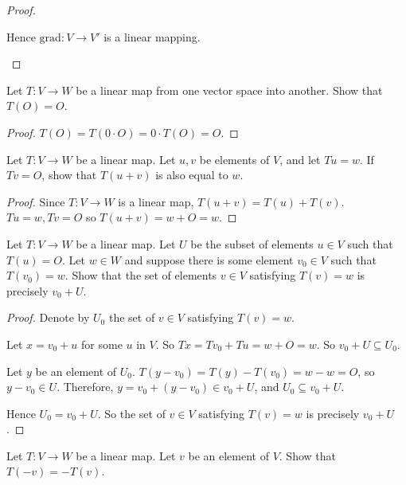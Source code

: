 \begin{proof}
\begin{enumerate}[label={(\alph*)}]
              Hence $\text{grad}: V \to V'$ is a linear mapping.
    \end{enumerate}
\end{proof}

\begin{exercise}
    Let $T: V \to W$ be a linear map from one vector space into another. Show that $T(O) = O$.
\end{exercise}

\begin{proof}
    $T(O) = T(0\cdot O) = 0\cdot T(O) = O$.
\end{proof}

\begin{exercise}
    Let $T: V \to W$ be a linear map. Let $u, v$ be elements of $V$, and let $Tu = w$. If $Tv = O$, show that $T(u + v)$ is also equal to $w$.
\end{exercise}

\begin{proof}
    Since $T: V\to W$ is a linear map, $T(u + v) = T(u) + T(v)$. $Tu = w, Tv = O$ so $T(u + v) = w + O = w$.
\end{proof}

\begin{exercise}
    Let $T: V \to W$ be a linear map. Let $U$ be the subset of elements $u\in V$ such that $T(u) = O$. Let $w\in W$ and suppose there is some element $v_{0}\in V$ such that $T(v_{0}) = w$. Show that the set of elements $v\in V$ satisfying $T(v) = w$ is precisely $v_{0} + U$.
\end{exercise}

\begin{proof}
    Denote by $U_{0}$ the set of $v\in V$ satisfying $T(v) = w$.

    Let $x = v_{0} + u$ for some $u$ in $V$. So $Tx = Tv_{0} + Tu = w + O = w$. So $v_{0} + U \subseteq U_{0}$.

    Let $y$ be an element of $U_{0}$. $T(y - v_{0}) = T(y) - T(v_{0}) = w - w = O$, so $y - v_{0}\in U$. Therefore, $y = v_{0} + (y - v_{0}) \in v_{0} + U$, and $U_{0} \subseteq v_{0} + U$.

    Hence $U_{0} = v_{0} + U$. So the set of $v\in V$ satisfying $T(v) = w$ is precisely $v_{0} + U$.
\end{proof}

\begin{exercise}
    Let $T: V \to W$ be a linear map. Let $v$ be an element of $V$. Show that $T(-v) = -T(v)$.
\end{exercise}

